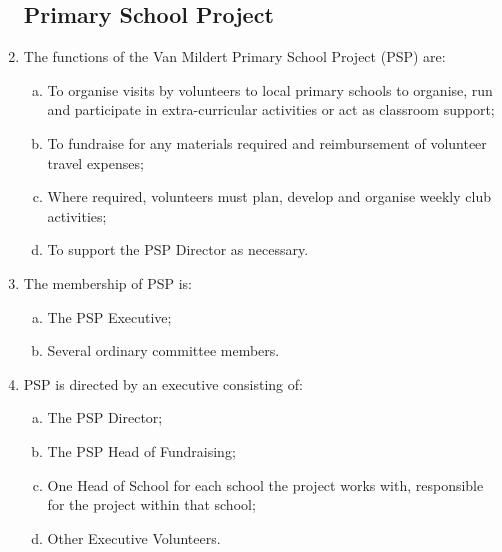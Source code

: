 \documentclass[12pt]{article}
\begin{document}
\begin{enumerate}
    \subsection{Primary School Project}
    \item The functions of the Van Mildert Primary School Project (PSP) are:
    \begin{enumerate}[(a)]
        \item To organise visits by volunteers to local primary schools to organise, run and participate in extra-curricular activities or act as classroom support;
        \item To fundraise for any materials required and reimbursement of volunteer travel expenses;
        \item Where required, volunteers must plan, develop and organise weekly club activities;
        \item To support the PSP Director as necessary.
    \end{enumerate}
    \item  The membership of PSP is:
    \begin{enumerate}[(a)]
        \item The PSP Executive;
        \item Several ordinary committee members.
    \end{enumerate}
    \item PSP is directed by an executive consisting of:
    \begin{enumerate}[(a)]
        \item The PSP Director;
        \item The PSP Head of Fundraising;
        \item One Head of School for each school the project works with, responsible for the project within that school;
        \item Other Executive Volunteers.
    \end{enumerate}
     

\end{enumerate}
\end{document}
